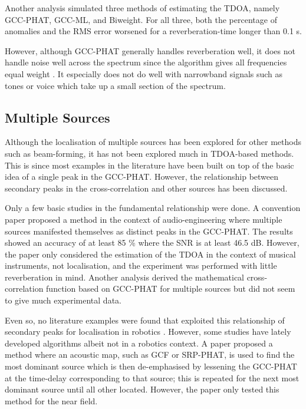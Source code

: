 \documentclass[notitlepage]{report}
\begin{document}
Another analysis \cite{brandstein_robust_1997} simulated three methods of estimating the TDOA, namely GCC-PHAT, GCC-ML, and Biweight. For all three, both the percentage of anomalies and the RMS error worsened for a reverberation-time longer than 0.1 \si{s}.

However, although GCC-PHAT generally handles reverberation well, it does not handle noise well across the spectrum since the algorithm gives all frequencies equal weight \cite{valin_robust_2003}. It especially does not do well with narrowband signals such as tones or voice which take up a small section of the spectrum.


\subsection{Multiple Sources}

Although the localisation of multiple sources has been explored for other methods such as beam-forming, it has not been explored much in TDOA-based methods. This is since most examples in the literature have been built on top of the basic idea of a single peak in the GCC-PHAT. However, the relationship between secondary peaks in the cross-correlation and other sources has been discussed.

Only a few basic studies in the fundamental relationship were done. A convention paper \cite{clifford_calculating_2010} proposed a method in the context of audio-engineering where multiple sources manifested themselves as distinct peaks in the GCC-PHAT. The results showed an accuracy of at least 85 \% where the SNR is at least 46.5 \si{dB}. However, the paper only considered the estimation of the TDOA in the context of musical instruments, not localisation, and the experiment was performed with little reverberation in mind. Another analysis \cite{kwon_analysis_2010} derived the mathematical cross-correlation function based on GCC-PHAT for multiple sources but did not seem to give much experimental data. 

Even so, no literature examples were found that exploited this relationship of secondary peaks for localisation in robotics \cite{rascon_localization_2017}. However, some studies have lately developed algorithms albeit not in a robotics context. A paper \cite{brutti_multiple_2010} proposed a method where an acoustic map, such as GCF or SRP-PHAT, is used to find the most dominant source which is then de-emphasised by lessening the GCC-PHAT at the time-delay corresponding to that source; this is repeated for the next most dominant source until all other located. However, the paper only tested this method for the near field.
\end{document}
